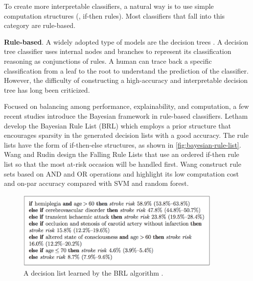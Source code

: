 To create more interpretable classifiers, a natural way is to use simple computation structures (\eg, if-then rules). Most classifiers that fall into this category are rule-based. 

\textbf{Rule-based}. A widely adopted type of models are the decision trees \cite{breiman1984classificationtree}. A decision tree classifier uses internal nodes and branches to represent its classification reasoning as conjunctions of rules. A human can trace back a specific classification from a leaf to the root to understand the prediction of the classifier. However, the difficulty of constructing a high-accuracy and interpretable decision tree has long been criticized. 

Focused on balancing among performance, explainability, and computation, a few recent studies introduce the Bayesian framework in rule-based classifiers. Letham \etal \cite{letham2015stroke} develop the Bayesian Rule List (BRL) which employs a prior structure that encourages sparsity in the generated decision lists with a good accuracy. The rule lists have the form of if-then-else structures, as shown in \autoref{fig:bayesian-rule-list}. Wang and Rudin \cite{wang2015falling} design the Falling Rule Lists that use an ordered if-then rule list so that the most at-risk occasion will be handled first. Wang \etal \cite{wang2017rulesets} construct rule sets based on AND and OR operations and highlight its low computation cost and on-par accuracy compared with SVM and random forest.


\begin{figure}[tb]
  \centering
  \includegraphics[width=0.9\textwidth]{figure/bayesian-rule-list}
  \caption{A decision list learned by the BRL algorithm \cite{letham2015stroke}.}
  \label{fig:bayesian-rule-list}
\end{figure}

